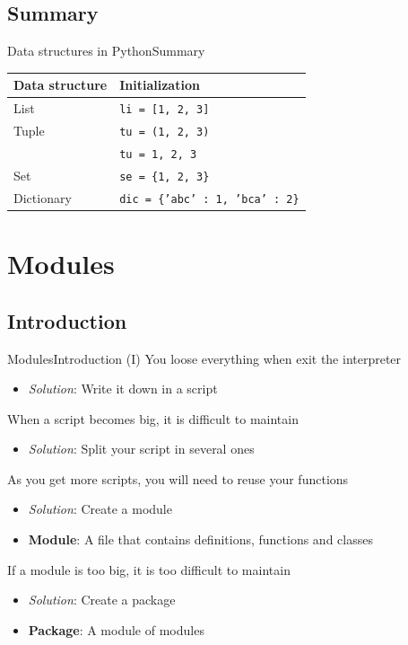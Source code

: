 \documentclass[10pt,compress]{beamer} %
\begin{document}
\subsection{Summary}
\begin{frame}{Data structures in Python}{Summary}
	
\centering \begin{tabular}{l|l}
\hline
\sc Data structure & \sc Initialization  \\\hline
List   & \texttt{li = [1, 2, 3]} \\
Tuple  & \texttt{tu = (1, 2, 3)} \\
	   & \texttt{tu = 1, 2, 3} \\
Set    & \texttt{se = \{1, 2, 3\}} \\
Dictionary& \texttt{dic = \{'abc' : 1, 'bca' : 2\}} \\\hline
\end{tabular}
\end{frame}

\section{Modules}
\subsection{Introduction}
\begin{frame}{Modules}{Introduction (I)}
		You loose everything when exit the interpreter
			\begin{itemize}
			\item \textit{Solution}: Write it down in a script
			\end{itemize}
		When a script becomes big, it is difficult to maintain
			\begin{itemize}
			\item \textit{Solution}: Split your script in several ones
			\end{itemize}
		As you get more scripts, you will need to reuse your functions
			\begin{itemize}
			\item \textit{Solution}: Create a \alert{module}
			\item \textbf{Module}: A file that contains definitions, functions and classes
			\end{itemize}
		If a module is too big, it is too difficult to maintain
			\begin{itemize}
			\item \textit{Solution}: Create a \alert{package}
			\item \textbf{Package}: A module of modules
			\end{itemize}
\end{frame}
\end{document}
